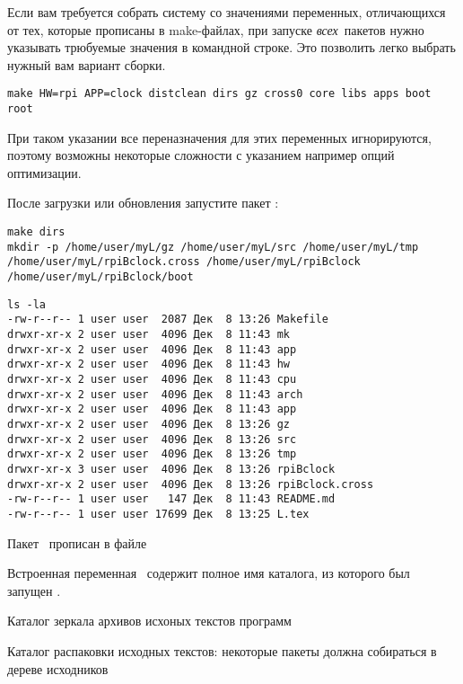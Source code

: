 
Если вам требуется собрать систему со значениями переменных, отличающихся от
тех, которые прописаны в make-файлах, при запуске \emph{всех}\ пакетов нужно
указывать трюбуемые значения в командной строке. Это позволить легко выбрать
нужный вам вариант сборки.

\begin{verbatim}
make HW=rpi APP=clock distclean dirs gz cross0 core libs apps boot root
\end{verbatim}

При таком указании все переназначения для этих переменных игнорируются, поэтому
возможны некоторые сложности с указанием например опций оптимизации.

 \label{azdirs}

После загрузки или обновления запустите пакет :

\begin{verbatim}
make dirs
mkdir -p /home/user/myL/gz /home/user/myL/src /home/user/myL/tmp
/home/user/myL/rpiBclock.cross /home/user/myL/rpiBclock
/home/user/myL/rpiBclock/boot
\end{verbatim}
\begin{verbatim}
ls -la
-rw-r--r-- 1 user user  2087 Дек  8 13:26 Makefile
drwxr-xr-x 2 user user  4096 Дек  8 11:43 mk
drwxr-xr-x 2 user user  4096 Дек  8 11:43 app
drwxr-xr-x 2 user user  4096 Дек  8 11:43 hw
drwxr-xr-x 2 user user  4096 Дек  8 11:43 cpu
drwxr-xr-x 2 user user  4096 Дек  8 11:43 arch
drwxr-xr-x 2 user user  4096 Дек  8 11:43 app
drwxr-xr-x 2 user user  4096 Дек  8 13:26 gz
drwxr-xr-x 2 user user  4096 Дек  8 13:26 src
drwxr-xr-x 2 user user  4096 Дек  8 13:26 tmp
drwxr-xr-x 3 user user  4096 Дек  8 13:26 rpiBclock
drwxr-xr-x 2 user user  4096 Дек  8 13:26 rpiBclock.cross
-rw-r--r-- 1 user user   147 Дек  8 11:43 README.md
-rw-r--r-- 1 user user 17699 Дек  8 13:25 L.tex
\end{verbatim}

Пакет \ прописан в файле


Встроенная переменная \ содержит полное имя каталога, из которого был
запущен .

\bigskip
Каталог зеркала архивов исхоных текстов программ


Каталог распаковки исходных текстов: некоторые пакеты должна собираться в дереве
исходников

